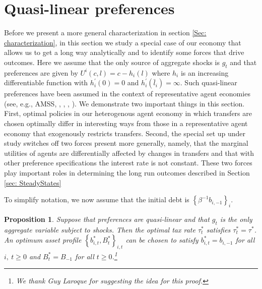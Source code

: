 \documentclass[thmsb,11pt]{article}
\newtheorem{proposition}{Proposition}
\begin{document}
\section{Quasi-linear preferences}\label{Sec: quasilinear}
Before we present a more general characterization in section \ref{Sec: characterization}, in this section we study a special case of our economy that allows us to get a long way analytically and to identify some forces that drive outcomes. Here we assume that the only source of aggregate shocks is  $g_t$ and that preferences are given by $U^{i}\left( c,l\right) =c-h_{i}(l)$ where $h_{i}$ is an increasing differentiable function with $h_{i}^{\prime
}\left( 0\right) =0$ and $h_{i}^{\prime }\left( \bar{l}_{i}\right) =\infty $. Such quasi-linear preferences have been assumed in the context of representative agent economies (see, e.g.,  AMSS, \cite{Farhi2010}, \cite{Battaglini2007,Battaglini2008}, \cite{Yared2010}, \cite{Faraglia2011}). We demonstrate two important things in this section. First, optimal policies in our heterogenous agent  economy in which transfers are chosen optimally
 differ in interesting ways from those
 in a representative agent economy  that exogenously restricts  transfers. Second, the special  set up under study switches off two forces  present more generally, namely, that the marginal utilities of agents are differentially affected by changes in transfers and that with other preference specifications the interest rate  is not constant. These two forces  play  important roles in determining the long run outcomes described in Section \ref{sec: SteadyStates}

To simplify notation, we now assume that the initial debt is $%
\left\{ \beta ^{-1}b_{i,-1}\right\} _{i}.$

\begin{proposition}
\label{Prop: quasilinear} Suppose that preferences are quasi-linear and that  $g_t$ is the only aggregate variable subject to  shocks. Then the optimal tax rate $\tau
_{t}^{\ast }$ satisfies $\tau _{t}^{\ast }=\tau ^{\ast }$. An optimum asset
profile $\left \{ b_{i,t}^{\ast },B_{t}^{\ast }\right \} _{i,t}$ can be
chosen to satisfy $b_{i,t}^{\ast }=b_{i,-1}$ for all $i,\ t\geq 0$ and $%
B_{t}^{\ast }=B_{-1}$ for all $t\geq 0$.\footnote{%
We thank Guy Laroque for suggesting the idea for this proof.}
\end{proposition}
\end{document}
